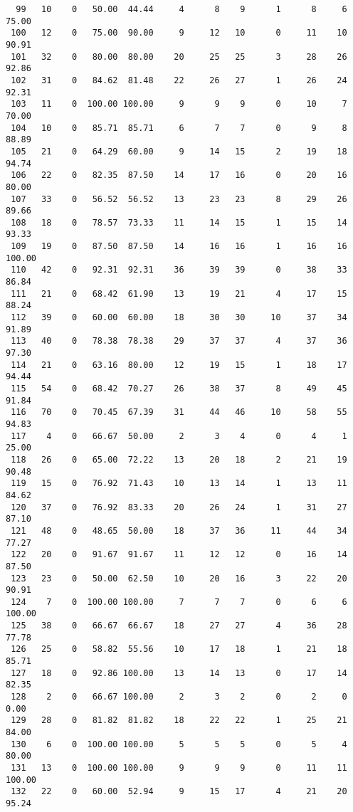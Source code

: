 \begin{verbatim}
  99   10    0   50.00  44.44     4      8    9      1      8     6    75.00
 100   12    0   75.00  90.00     9     12   10      0     11    10    90.91
 101   32    0   80.00  80.00    20     25   25      3     28    26    92.86
 102   31    0   84.62  81.48    22     26   27      1     26    24    92.31
 103   11    0  100.00 100.00     9      9    9      0     10     7    70.00
 104   10    0   85.71  85.71     6      7    7      0      9     8    88.89
 105   21    0   64.29  60.00     9     14   15      2     19    18    94.74
 106   22    0   82.35  87.50    14     17   16      0     20    16    80.00
 107   33    0   56.52  56.52    13     23   23      8     29    26    89.66
 108   18    0   78.57  73.33    11     14   15      1     15    14    93.33
 109   19    0   87.50  87.50    14     16   16      1     16    16   100.00
 110   42    0   92.31  92.31    36     39   39      0     38    33    86.84
 111   21    0   68.42  61.90    13     19   21      4     17    15    88.24
 112   39    0   60.00  60.00    18     30   30     10     37    34    91.89
 113   40    0   78.38  78.38    29     37   37      4     37    36    97.30
 114   21    0   63.16  80.00    12     19   15      1     18    17    94.44
 115   54    0   68.42  70.27    26     38   37      8     49    45    91.84
 116   70    0   70.45  67.39    31     44   46     10     58    55    94.83
 117    4    0   66.67  50.00     2      3    4      0      4     1    25.00
 118   26    0   65.00  72.22    13     20   18      2     21    19    90.48
 119   15    0   76.92  71.43    10     13   14      1     13    11    84.62
 120   37    0   76.92  83.33    20     26   24      1     31    27    87.10
 121   48    0   48.65  50.00    18     37   36     11     44    34    77.27
 122   20    0   91.67  91.67    11     12   12      0     16    14    87.50
 123   23    0   50.00  62.50    10     20   16      3     22    20    90.91
 124    7    0  100.00 100.00     7      7    7      0      6     6   100.00
 125   38    0   66.67  66.67    18     27   27      4     36    28    77.78
 126   25    0   58.82  55.56    10     17   18      1     21    18    85.71
 127   18    0   92.86 100.00    13     14   13      0     17    14    82.35
 128    2    0   66.67 100.00     2      3    2      0      2     0     0.00
 129   28    0   81.82  81.82    18     22   22      1     25    21    84.00
 130    6    0  100.00 100.00     5      5    5      0      5     4    80.00
 131   13    0  100.00 100.00     9      9    9      0     11    11   100.00
 132   22    0   60.00  52.94     9     15   17      4     21    20    95.24

\end{verbatim}
